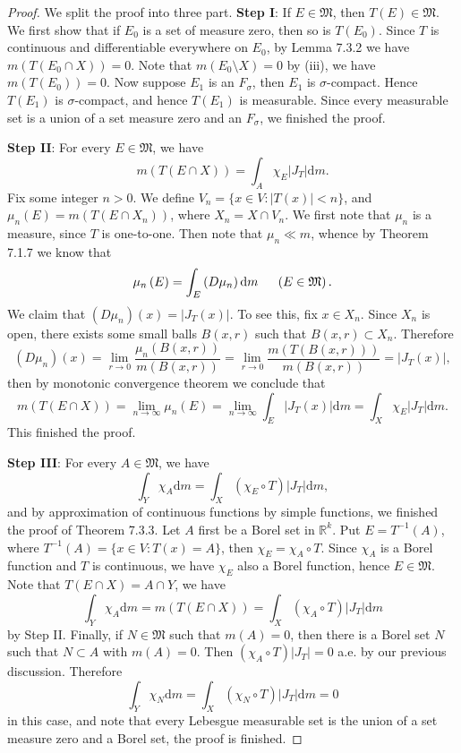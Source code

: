 \begin{proof}
We split the proof into three part.
\textbf{Step I}: If $E\in\mathfrak{M}$, then $T(E)\in\mathfrak{M}$. We first show that if $E_0$ is a set of measure zero, then so is $T(E_0)$. Since $T$ is continuous and differentiable everywhere on $E_0$, by Lemma 7.3.2 we have $m(T(E_0\cap X))=0$. Note that $m(E_0\setminus X)=0$ by (iii), we have $m(T(E_0))=0$. Now suppose $E_1$ is an $F_\sigma$, then $E_1$ is $\sigma$-compact. Hence $T(E_1)$ is $\sigma$-compact, and hence $T(E_1)$ is measurable. Since every measurable set is a union of a set measure zero and an $F_\sigma$, we finished the proof.\par
\textbf{Step II}: For every $E\in\mathfrak{M}$, we have 
$$
m\left( T\left( E\cap X \right) \right) =\int_A{\chi _E\left| J_T \right|\mathrm{d}m}.
$$
Fix some integer $n>0$. We define $V_n=\{x\in V:|T(x)|<n\}$, and $\mu_n(E)=m(T(E\cap X_n))$, where $X_n=X\cap V_n$. We first note that $\mu_n$ is a measure, since $T$ is one-to-one. Then note that $\mu_n\ll m$, whence by Theorem 7.1.7 we know that 
$$
\mu _n\left( E \right) =\int_E{\left( D\mu _n \right) \mathrm{d}m}\hspace{0.5cm}\left( E\in \mathfrak{M} \right) .
$$
We claim that $(D\mu_n)(x)=|J_T(x)|$. To see this, fix $x\in X_n$. Since $X_n$ is open, there exists some small balls $B(x,r)$ such that $B(x,r)\subset X_n$. Therefore 
$$
\left( D\mu _n \right) \left( x \right) =\lim_{r\rightarrow 0} \frac{\mu _n\left( B\left( x,r \right) \right)}{m\left( B\left( x,r \right) \right)}=\lim_{r\rightarrow 0} \frac{m\left( T\left( B\left( x,r \right) \right) \right)}{m\left( B\left( x,r \right) \right)}=\left| J_T\left( x \right) \right|,
$$
then by monotonic convergence theorem we conclude that 
$$
m\left( T\left( E\cap X \right) \right) =\lim_{n\rightarrow \infty} \mu _n\left( E \right) =\lim_{n\rightarrow \infty} \int_E{\left| J_T\left( x \right) \right|\mathrm{d}m}=\int_X{\chi _E\left| J_T \right|\mathrm{d}m}.
$$
This finished the proof.\par
\textbf{Step III}: For every $A\in\mathfrak{M}$, we have 
$$
\int_Y{\chi _A\mathrm{d}m}=\int_X{\left( \chi _E\circ T \right) \left| J_T \right|\mathrm{d}m},
$$
and by approximation of continuous functions by simple functions, we finished the proof of Theorem 7.3.3. Let $A$ first be a Borel set in $\mathbb{R}^k$. Put $E=T^{-1}(A)$, where $T^{-1}(A)=\{x\in V:T(x)=A\}$, then $\chi_E=\chi_A\circ T$. Since $\chi_A$ is a Borel function and $T$ is continuous, we have $\chi_E$ also a Borel function, hence $E\in\mathfrak{M}$. Note that $T(E\cap X)=A\cap Y$, we have 
$$
\int_Y{\chi _A\mathrm{d}m}=m\left( T\left( E\cap X \right) \right) =\int_X{\left( \chi _A\circ T \right) \left| J_T \right|\mathrm{d}m}
$$
by Step II. Finally, if $N\in\mathfrak{M}$ such that $m(A)=0$, then there is a Borel set $N$ such that $N\subset A$ with $m(A)=0$. Then $(\chi_A\circ T)|J_T|=0$ a.e. by our previous discussion. Therefore 
$$
\int_Y{\chi _N\mathrm{d}m}=\int_X{\left( \chi _N\circ T \right) \left| J_T \right|\mathrm{d}m}=0
$$
in this case, and note that every Lebesgue measurable set is the union of a set measure zero and a Borel set, the proof is finished.
\end{proof}
